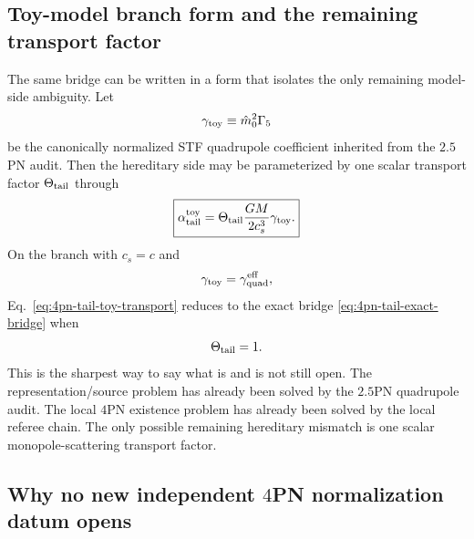\documentclass[11pt]{article}
\begin{document}
\subsection{Toy-model branch form and the remaining transport factor}
\label{sec:tail-toy-branch}

The same bridge can be written in a form that isolates the only remaining
model-side ambiguity.  Let
\begin{equation}
\gamma_{\rm toy}
\equiv
\hat m_0^2\Gamma_5
\label{eq:4pn-tail-toy-gamma}
\end{equation}
be the canonically normalized STF quadrupole coefficient inherited from the
$2.5$PN audit.  Then the hereditary side may be parameterized by one scalar
transport factor $\Theta_{\rm tail}$ through
\begin{equation}
\boxed{
\alpha_{\rm tail}^{\rm toy}
=
\Theta_{\rm tail}
\frac{GM}{2c_s^3}
\gamma_{\rm toy}.
}
\label{eq:4pn-tail-toy-transport}
\end{equation}
On the branch with $c_s=c$ and
\begin{equation}
\gamma_{\rm toy}=
\gamma_{\rm quad}^{\rm eff},
\label{eq:4pn-tail-toy-canonical-branch}
\end{equation}
Eq.~\eqref{eq:4pn-tail-toy-transport} reduces to the exact bridge
\eqref{eq:4pn-tail-exact-bridge} when
\begin{equation}
\Theta_{\rm tail}=1.
\label{eq:4pn-tail-theta-one}
\end{equation}
This is the sharpest way to say what is and is not still open.  The
representation/source problem has already been solved by the $2.5$PN quadrupole
audit.  The local $4$PN existence problem has already been solved by the local
referee chain.  The only possible remaining hereditary mismatch is one scalar
monopole-scattering transport factor.

\subsection{Why no new independent \texorpdfstring{$4$}{4}PN normalization datum opens}
\label{sec:tail-no-new-datum}
\end{document}
